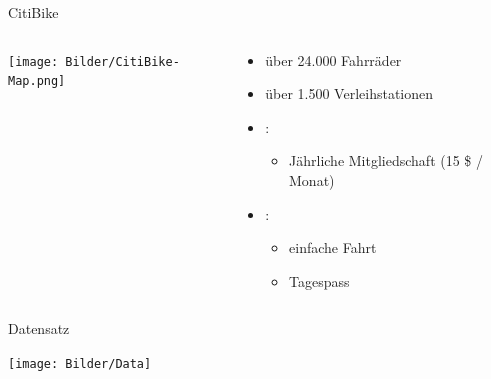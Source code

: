 \begin{frame}{CitiBike}
\begin{columns}
\begin{column}{0.4\linewidth}
\texttt{[image: Bilder/CitiBike-Map.png]}
\end{column}
\begin{column}{0.6\linewidth}

{
\begin{itemize}
\item über 24.000 Fahrräder
\item über 1.500 Verleihstationen
\end{itemize}
}
{
\begin{itemize}
\item {}:
\begin{itemize}
\item  Jährliche Mitgliedschaft (15 \$ / Monat)
\end{itemize}
\item {}: 
\begin{itemize}
\item {} einfache Fahrt
\item {} Tagespass
\end{itemize}
\end{itemize}
}
{}
\end{column}
\end{columns}
\end{frame}

\begin{frame}{Datensatz}

\texttt{[image: Bilder/Data]}

\end{frame}




